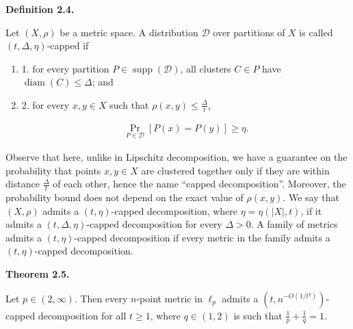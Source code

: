 \documentclass[10pt,a4paper]{amsart}
\begin{document}
\par
\par
\par\medskip\noindent\textbf{Definition 2.4.}\par
Let $(X,\rho)$ be a metric space. A distribution $\mathcal{D}$ over partitions of $X$ is called $(t,\Delta,\eta)$-capped if
\par
\begin{enumerate}
\item  1. 
for every partition $P\in\operatorname{supp}(\mathcal{D})$, all clusters $C\in P$ have $\operatorname{diam}(C)\leq\Delta$; and
\par
\par
\item  2. 
for every $x,y\in X$ such that $\rho(x,y)\leq\frac{\Delta}{t}$,
\par
\[\begin{aligned}
\Pr_{P\in\mathcal{D}}[P(x)=P(y)]\geq\eta.
\end{aligned}\]
\par
\end{enumerate}
\par
\par
Observe that here, unlike in Lipschitz decomposition, we have a guarantee on the probability that points $x,y\in X$ are clustered together only if they are within distance $\frac{\Delta}{t}$ of each other, hence the name “capped decomposition”. Moreover, the probability bound does not depend on the exact value of $\rho(x,y)$. We say that $(X,\rho)$ admits a $(t,\eta)$-capped decomposition, where $\eta=\eta(|X|,t)$, if it admits a $(t,\Delta,\eta)$-capped decomposition for every $\Delta>0$. A family of metrics admits a $(t,\eta)$-capped decomposition if every metric in the family admits a $(t,\eta)$-capped decomposition.
\par
\par

\par\medskip\noindent\textbf{Theorem 2.5.}\par
Let $p\in(2,\infty)$. Then every $n$-point metric in $\ell_{p}$ admits a $(t,n^{-O(1/t^{q})})$-capped decomposition for all $t\geq 1$, where $q\in(1,2)$ is such that $\frac{1}{p}+\frac{1}{q}=1$.
\par
\end{document}
